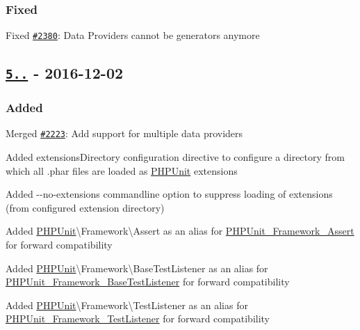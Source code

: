 \subsubsection*{Fixed}


\begin{DoxyItemize}
\item Fixed \href{https://github.com/sebastianbergmann/phpunit/issues/2380}{\tt \#2380}\+: Data Providers cannot be generators anymore
\end{DoxyItemize}

\subsection*{\href{https://github.com/sebastianbergmann/phpunit/compare/5.6...5.7.0}{\tt 5..} -\/ 2016-\/12-\/02}

\subsubsection*{Added}


\begin{DoxyItemize}
\item Merged \href{https://github.com/sebastianbergmann/phpunit/pull/2223}{\tt \#2223}\+: Add support for multiple data providers
\item Added {\ttfamily extensions\+Directory} configuration directive to configure a directory from which all {\ttfamily .phar} files are loaded as \mbox{\hyperlink{namespace_p_h_p_unit}{P\+H\+P\+Unit}} extensions
\item Added {\ttfamily -\/-\/no-\/extensions} commandline option to suppress loading of extensions (from configured extension directory)
\item Added {\ttfamily \mbox{\hyperlink{namespace_p_h_p_unit}{P\+H\+P\+Unit}}\textbackslash{}Framework\textbackslash{}Assert} as an alias for {\ttfamily \mbox{\hyperlink{class_p_h_p_unit___framework___assert}{P\+H\+P\+Unit\+\_\+\+Framework\+\_\+\+Assert}}} for forward compatibility
\item Added {\ttfamily \mbox{\hyperlink{namespace_p_h_p_unit}{P\+H\+P\+Unit}}\textbackslash{}Framework\textbackslash{}Base\+Test\+Listener} as an alias for {\ttfamily \mbox{\hyperlink{class_p_h_p_unit___framework___base_test_listener}{P\+H\+P\+Unit\+\_\+\+Framework\+\_\+\+Base\+Test\+Listener}}} for forward compatibility
\item Added {\ttfamily \mbox{\hyperlink{namespace_p_h_p_unit}{P\+H\+P\+Unit}}\textbackslash{}Framework\textbackslash{}Test\+Listener} as an alias for {\ttfamily \mbox{\hyperlink{interface_p_h_p_unit___framework___test_listener}{P\+H\+P\+Unit\+\_\+\+Framework\+\_\+\+Test\+Listener}}} for forward compatibility
\end{DoxyItemize}

